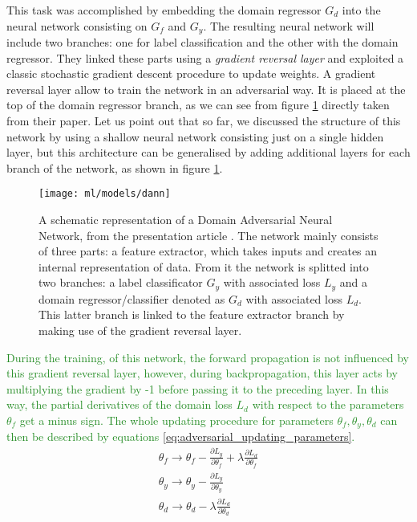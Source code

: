 \documentclass[11pt]{report}
\begin{document}
This task was accomplished by embedding the domain regressor $G_d$ into the neural network consisting on $G_f$ and $G_y$.
The resulting neural network will include two branches: one for label classification and the other with the domain regressor.
They linked these parts using a \emph{gradient reversal layer} and exploited a classic stochastic gradient descent procedure to update weights.
A gradient reversal layer allow to train the network in an adversarial way.
It is placed at the top of the domain regressor branch, as we can see from figure \ref{fig:dann_original} directly taken from their paper.
Let us point out that so far, we discussed the structure of this network by using a shallow neural network consisting just on a single hidden layer, but this architecture can be generalised by adding additional layers for each branch of the network, as shown in figure \ref{fig:dann_original}.


\begin{figure}[h]
\centering
\texttt{[image: ml/models/dann]}
\caption{A schematic representation of a Domain Adversarial Neural Network, from the presentation article \cite{ganin2016}. The network mainly consists of three parts: a feature extractor, which takes inputs and creates an internal representation of data. From it the network is splitted into two branches: a label classificator $G_y$ with associated loss $L_y$ and a domain regressor/classifier denoted as $G_d$ with associated loss $L_d$. This latter branch is linked to the feature extractor branch by making use of the gradient reversal layer.
}\label{fig:dann_original}
\end{figure}


\textcolor{ForestGreen}{
During the training, of this network, the forward propagation is not influenced by this gradient reversal layer, however, during backpropagation, this layer acts by multiplying the gradient by -1 before passing it to the preceding layer.
In this way, the partial derivatives of the domain loss $L_d$ with respect to the parameters $\theta_f$ get a minus sign.
The whole updating procedure for parameters $\theta_f, \theta_y, \theta_d$ can then be described by equations \ref{eq:adversarial_updating_parameters}.
}
\begin{equation}\label{eq:adversarial_updating_parameters}
\begin{split}
\theta_f \rightarrow \theta_f - \frac{\partial L_y}{\partial \theta_f} +  \lambda \frac{\partial L_d}{\partial \theta_f}\\
\theta_y \rightarrow \theta_y -  \frac{\partial L_y}{\partial \theta_y} \\
\theta_d \rightarrow \theta_d - \lambda \frac{\partial L_d}{\partial \theta_d}
\end{split}
\end{equation}
\end{document}
